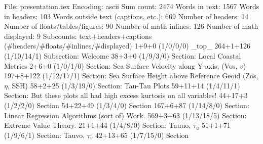 File: presentation.tex
Encoding: ascii
Sum count: 2474
Words in text: 1567
Words in headers: 103
Words outside text (captions, etc.): 669
Number of headers: 14
Number of floats/tables/figures: 90
Number of math inlines: 126
Number of math displayed: 9
Subcounts:
  text+headers+captions (#headers/#floats/#inlines/#displayed)
  1+9+0 (1/0/0/0) _top_
  264+1+126 (1/10/14/1) Subsection: Welcome
  38+3+0 (1/9/3/0) Section: Local Coastal Metrics
  2+6+0 (1/0/1/0) Section: Sea Surface Velocity along Y-axis, (Vos, $v$) 
  197+8+122 (1/12/17/1) Section: Sea Surface Height above Reference Geoid (Zos, $\eta$, SSH) 
  58+2+25 (1/3/19/0) Section: Tau-Tau Plots
  59+11+14 (1/4/11/1) Section: But these plots all had high excess kurtosis on all variables!  
  44+17+3 (1/2/2/0) Section
  54+22+49 (1/3/4/0) Section
  167+6+87 (1/14/8/0) Section: Linear Regression Algorithms (sort of) Work. 
  569+3+63 (1/13/18/5) Section: Extreme Value Theory. 
  21+1+44 (1/4/8/0) Section: Tauuo, $\tau_u$ 
  51+1+71 (1/9/6/1) Section: Tauvo, $\tau_v$ 
  42+13+65 (1/7/15/0) Section

